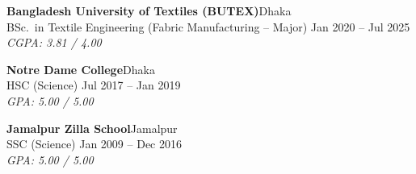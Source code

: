 

\textbf{Bangladesh University of Textiles (BUTEX)}\hfill Dhaka\\
\vspace{1mm}
BSc.\ in Textile Engineering (Fabric Manufacturing – Major) \hfill Jan 2020 – Jul 2025\\
\vspace{1mm}
\textit{CGPA\@: 3.81 / 4.00}
\vspace{3mm}

\textbf{Notre Dame College}\hfill Dhaka\\
\vspace{1mm}
HSC (Science) \hfill Jul 2017 – Jan 2019\\
\vspace{1mm}
\textit{GPA\@: 5.00 / 5.00}
\vspace{3mm}

\textbf{Jamalpur Zilla School}\hfill Jamalpur\\
\vspace{1mm}
SSC (Science) \hfill Jan 2009 – Dec 2016\\
\vspace{1mm}
\textit{GPA\@: 5.00 / 5.00}
